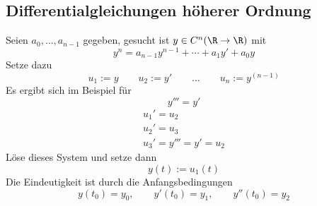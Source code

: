 \documentclass[a4paper,10pt]{scrbook}
\begin{document}
\subsection{Differentialgleichungen höherer Ordnung} %


Seien $a_0, \dotsc, a_{n-1}$ gegeben, gesucht ist $y \in C^n (\R \to \R)$ mit
\[
	y^{n} = a_{n-1} y^{n-1} + \dotsb + a_1 y' + a_0 y
\]
Setze dazu
\[
	u_1 := y \qquad u_2 := y' \qquad \dotsc \qquad u_n := y^{(n-1)}
\]
Es ergibt sich im Beispiel für 
\[
	y''' = y'
\]
\begin{align*}
	u_1' = u_2 \\
	u_2' = u_3 \\
	u_3' = y''' = y' = u_2
\end{align*}
Löse dieses System und setze dann
\[
	y(t) := u_1(t)
\]
Die Eindeutigkeit ist durch die Anfangsbedingungen
\[
	y(t_0) = y_0, \qquad y'(t_0) = y_1, \qquad y''(t_0) = y_2
\]
\end{document}
